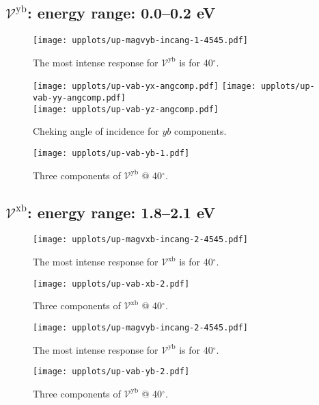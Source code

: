 \documentclass{article}
\let\Oldsubsection\subsection
\renewcommand{\subsection}{\FloatBarrier\Oldsubsection}
\begin{document}
\subsection{$\mathcal{V}^{\mathrm{yb}} $: energy range: 0.0--0.2 eV }
\begin{figure}[h]
    \centering
    \texttt{[image: upplots/up-magvyb-incang-1-4545.pdf]}
    \caption{The most intense response for $\mathcal{V}^{\mathrm{yb}} $ is for 
    40$^{\circ}$.}
    \label{fig:up-magvybincang1}
\end{figure}
\begin{figure}[ht]
    \centering
    \texttt{[image: upplots/up-vab-yx-angcomp.pdf]}
    \texttt{[image: upplots/up-vab-yy-angcomp.pdf]}\\
    \texttt{[image: upplots/up-vab-yz-angcomp.pdf]}
    \caption{Cheking angle of incidence for $yb$ components.}
    \label{fig:up-ybangcomp}
\end{figure}
\begin{figure}[ht]
    \centering
    \texttt{[image: upplots/up-vab-yb-1.pdf]}
    \caption{Three components of $\mathcal{V}^{\mathrm{yb}} $ @ 40$^{\circ}$.}
    \label{fig:up-vyb1}
\end{figure}



\subsection{$\mathcal{V}^{\mathrm{xb}} $: energy range: 1.8--2.1 eV }


\begin{figure}[h]
    \centering
    \texttt{[image: upplots/up-magvxb-incang-2-4545.pdf]}
    \caption{The most intense response for $\mathcal{V}^{\mathrm{xb}} $ is for 
    40$^{\circ}$.}
    \label{fig:up-magxbincang2}
\end{figure}
\begin{figure}[h]
    \centering
    \texttt{[image: upplots/up-vab-xb-2.pdf]}
    \caption{Three components of $\mathcal{V}^{\mathrm{xb}} $ @ 40$^{\circ}$.}
    \label{fig:up-vxb2}
\end{figure}


\begin{figure}[ht]
    \centering
    \texttt{[image: upplots/up-magvyb-incang-2-4545.pdf]}
    \caption{The most intense response for $\mathcal{V}^{\mathrm{yb}} $ is for 
    40$^{\circ}$.}
    \label{fig:up-magybincang2}
\end{figure}
\begin{figure}[ht]
    \centering
    \texttt{[image: upplots/up-vab-yb-2.pdf]}
    \caption{Three components of $\mathcal{V}^{\mathrm{yb}} $ @ 40$^{\circ}$.}
    \label{fig:upvyb2}
\end{figure}
\end{document}
